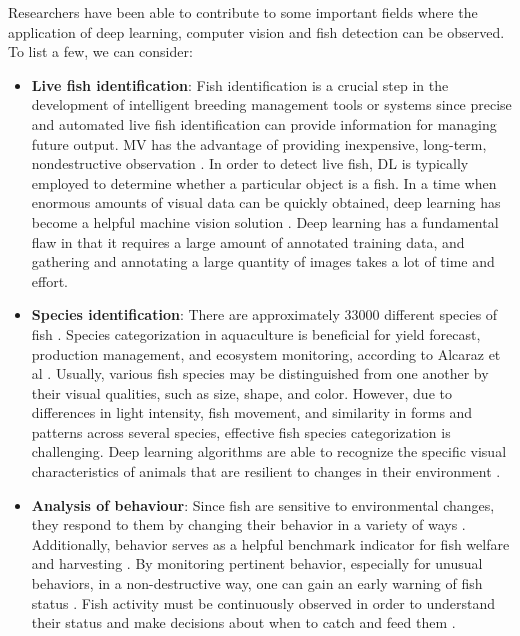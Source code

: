 Researchers have been able to contribute to some important fields where the application of deep learning, computer vision and fish detection can be observed. To list a few, we can consider:
\begin{itemize}
    \item \textbf{Live fish identification}: Fish identification is a crucial step in the development of intelligent breeding management tools or systems since precise and automated live fish identification can provide information for managing future output. MV has the advantage of providing inexpensive, long-term, nondestructive observation \cite{zhou2018handling}. In order to detect live fish, DL is typically employed to determine whether a particular object is a fish. In a time when enormous amounts of visual data can be quickly obtained, deep learning has become a helpful machine vision solution \cite{(salman2016fish}. Deep learning has a fundamental flaw in that it requires a large amount of annotated training data, and gathering and annotating a large quantity of images takes a lot of time and effort.
    \item \textbf{Species identification}: There are approximately 33000 different species of fish \cite{oosting2019unlocking}. Species categorization in aquaculture is beneficial for yield forecast, production management, and ecosystem monitoring, according to Alcaraz et al \cite{alcaraz2015herbivory}. Usually, various fish species may be distinguished from one another by their visual qualities, such as size, shape, and color. However, due to differences in light intensity, fish movement, and similarity in forms and patterns across several species, effective fish species categorization is challenging. Deep learning algorithms are able to recognize the specific visual characteristics of animals that are resilient to changes in their environment \cite{dos2019improving}.
    \item \textbf{Analysis of behaviour}: Since fish are sensitive to environmental changes, they respond to them by changing their behavior in a variety of ways \cite{mahesh2008feasibility}. Additionally, behavior serves as a helpful benchmark indicator for fish welfare and harvesting \cite{zion2012use}. By monitoring pertinent behavior, especially for unusual behaviors, in a non-destructive way, one can gain an early warning of fish status \cite{rillahan2011behavior}. Fish activity must be continuously observed in order to understand their status and make decisions about when to catch and feed them \cite{papadakis2012computer}.

\end{itemize}
